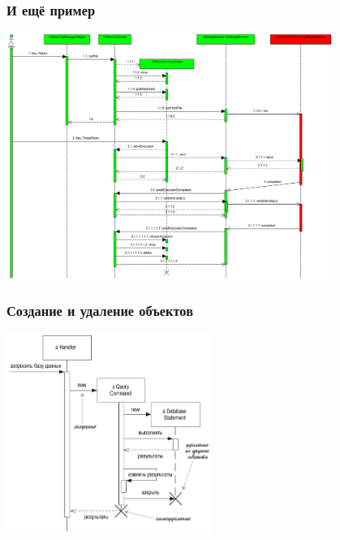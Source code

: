 \documentclass{../mcsslides}
\begin{document}
    \begin{frame}
        \frametitle{И ещё пример}
        \begin{center}
            \includegraphics[width=0.8\textwidth]{sequenceDiagramExample3.png}
        \end{center}
    \end{frame}

    \begin{frame}
        \frametitle{Создание и удаление объектов}
        \begin{center}
            \includegraphics[width=0.5\textwidth]{sequenceDiagramCreationAndDeletion.png}
        \end{center}
    \end{frame}
\end{document}
